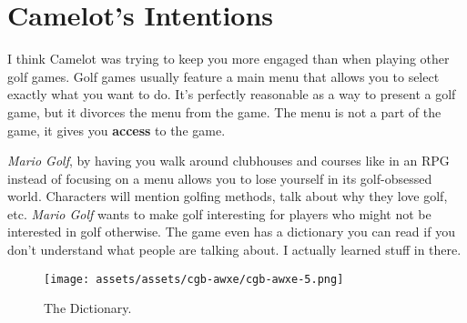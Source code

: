 \documentclass{book}
\let\oldcenter\center
\let\oldendcenter\endcenter
\renewenvironment{center}{\setlength\topsep{0pt}\oldcenter}{\oldendcenter}
\begin{document}
\FloatBarrier\needspace{10mm}\section*{Camelot’s Intentions}\nopagebreak[4]

I think Camelot was trying to keep you more engaged than when playing other golf games. Golf games usually feature a main menu that allows you to select exactly what you want to do. It’s perfectly reasonable as a way to present a golf game, but it divorces the menu from the game. The menu is not a part of the game, it gives you \textbf{access} to the game.

\begin{center}
\quad\vspace{4pt}
\quad\vspace{4pt}
\end{center}

\emph{Mario Golf}, by having you walk around clubhouses and courses like in an RPG instead of focusing on a menu allows you to lose yourself in its golf-obsessed world. Characters will mention golfing methods, talk about why they love golf, etc. \emph{Mario Golf} wants to make golf interesting for players who might not be interested in golf otherwise. The game even has a dictionary you can read if you don’t understand what people are talking about. I actually learned stuff in there.

\begin{figure}[hbt]
\vskip 10pt
\centering \texttt{[image: assets/assets/cgb-awxe/cgb-awxe-5.png]}\par\pagetwodescription The Dictionary.
\vskip 6pt
\end{figure}
\end{document}
